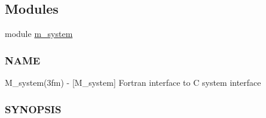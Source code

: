 \subsection*{Modules}
\begin{DoxyCompactItemize}
\item 
module \hyperlink{namespacem__system}{m\+\_\+system}
\begin{DoxyCompactList}\small\item\em \subsubsection*{N\+A\+ME}

M\+\_\+system(3fm) -\/ \mbox{[}M\+\_\+system\mbox{]} Fortran interface to C system interface \subsubsection*{S\+Y\+N\+O\+P\+S\+IS}\end{DoxyCompactList}\end{DoxyCompactItemize}
